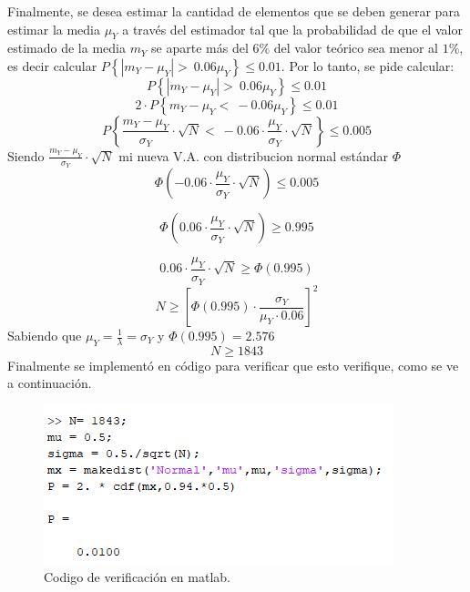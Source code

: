 Finalmente, se desea estimar la cantidad de elementos que se deben generar para estimar la media $\mu_Y$ a través del estimador tal que la probabilidad de que el valor estimado de la media $m_Y$ se aparte más del $6\%$ del valor teórico sea menor al $1\%$, es decir calcular $P\left\lbrace | m_Y - \mu_Y | > \ 0.06 \mu_Y \right\rbrace \leq 0.01$. %
%
Por lo tanto, se pide calcular: 
\begin{equation*}
	P\left\lbrace | m_Y - \mu_Y | > \ 0.06 \mu_Y \right\rbrace \leq 0.01
\end{equation*}
\begin{equation*}
	2\cdot P\left\lbrace m_Y - \mu_Y < \ -0.06 \mu_Y \right\rbrace \leq 0.01
\end{equation*}
\begin{equation*}
	P\left\lbrace  \frac{m_Y - \mu_Y}{\sigma_Y}\cdot \sqrt{N} < \ -0.06 \cdot \frac{\mu_Y}{\sigma_Y}\cdot \sqrt{N} \right\rbrace \leq 0.005
\end{equation*}
Siendo $\frac{m_Y - \mu_Y}{\sigma_Y}\cdot \sqrt{N}$ mi nueva V.A. con distribucion normal estándar $\Phi$
\begin{equation*}
\Phi\left( -0.06 \cdot \frac{\mu_Y}{\sigma_Y}\cdot \sqrt{N} \right) \leq 0.005
\end{equation*}

\begin{equation*}
\Phi\left( 0.06 \cdot \frac{\mu_Y}{\sigma_Y}\cdot \sqrt{N} \right) \geq 0.995
\end{equation*}

\begin{equation*}
 0.06 \cdot \frac{\mu_Y}{\sigma_Y}\cdot \sqrt{N} \geq \Phi \left( 0.995 \right)
\end{equation*}
\begin{equation*}
	N \geq \left[ \Phi \left( 0.995 \right) \cdot \frac{\sigma_Y}{\mu_Y \cdot 0.06}\right]^2
\end{equation*}
Sabiendo que $\mu_Y = \frac{1}{\lambda} = \sigma_Y$ y $\Phi \left( 0.995 \right)=2.576$
\begin{equation}
N \geq 1843 
\end{equation}
Finalmente se implementó en código para verificar que esto verifique, como se ve a continuación.

\begin{figure}[H]
	\centering
	\includegraphics[width=0.4\linewidth]{./ImagenesEjercicio1/implemetacion.PNG}
	\caption{Codigo de verificación en matlab.}
	\label{fig:imple}
\end{figure}